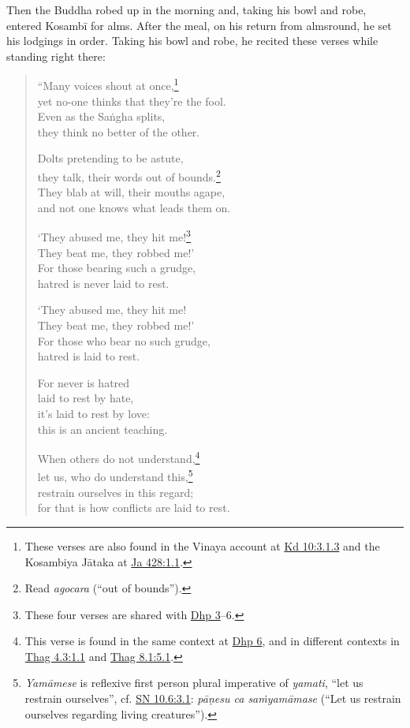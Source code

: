 \documentclass[12pt,openany]{book}%
\begin{document}
Then the Buddha robed up in the morning and, taking his bowl and robe, entered \textsanskrit{Kosambī} for alms. After the meal, on his return from almsround, he set his lodgings in order. Taking his bowl and robe, he recited these verses while standing right there: 

\begin{verse}%
“Many voices shout at once,\footnote{These verses are also found in the Vinaya account at \href{https://suttacentral.net/pli-tv-kd10/en/sujato\#3.1.3}{Kd 10:3.1.3} and the Kosambiya \textsanskrit{Jātaka} at \href{https://suttacentral.net/ja428/en/sujato\#1.1}{Ja 428:1.1}. } \\
yet no-one thinks that they’re the fool. \\
Even as the \textsanskrit{Saṅgha} splits, \\
they think no better of the other. 

Dolts pretending to be astute, \\
they talk, their words out of bounds.\footnote{Read \textit{agocara} (“out of bounds”). } \\
They blab at will, their mouths agape, \\
and not one knows what leads them on. 

‘They abused me, they hit me!\footnote{These four verses are shared with \href{https://suttacentral.net/dhp3/en/sujato}{Dhp 3}–6. } \\
They beat me, they robbed me!’ \\
For those bearing such a grudge, \\
hatred is never laid to rest. 

‘They abused me, they hit me! \\
They beat me, they robbed me!’ \\
For those who bear no such grudge, \\
hatred is laid to rest. 

For never is hatred \\
laid to rest by hate, \\
it’s laid to rest by love: \\
this is an ancient teaching. 

When others do not understand,\footnote{This verse is found in the same context at \href{https://suttacentral.net/dhp6/en/sujato}{Dhp 6}, and in different contexts in \href{https://suttacentral.net/thag4.3/en/sujato\#1.1}{Thag 4.3:1.1} and \href{https://suttacentral.net/thag8.1/en/sujato\#5.1}{Thag 8.1:5.1}. } \\
let us, who do understand this,\footnote{\textit{\textsanskrit{Yamāmese}} is reflexive first person plural imperative of \textit{yamati}, “let us restrain ourselves”, cf. \href{https://suttacentral.net/sn10.6/en/sujato\#3.1}{SN 10.6:3.1}: \textit{\textsanskrit{pāṇesu} ca \textsanskrit{saṁyamāmase}} (“Let us restrain ourselves regarding living creatures”). } \\
restrain ourselves in this regard; \\
for that is how conflicts are laid to rest. 


\end{verse}
\end{document}
